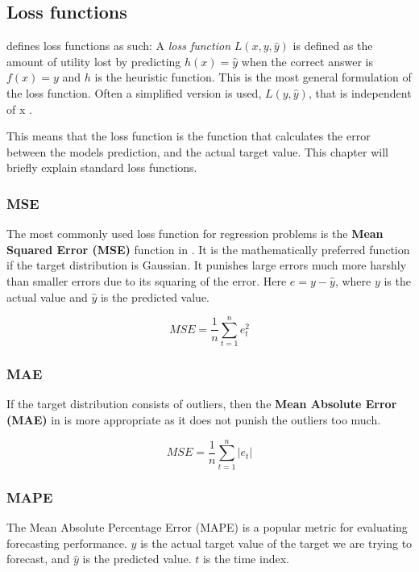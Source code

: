 \subsection{Loss functions}
\label{section:BT:Loss}
\citeauthor{Russel2012}  defines loss functions as such:
A \textit{loss function} $L(x, y, \hat{y})$ is defined as the amount of utility lost by predicting
$h(x)=\hat{y}$ when the correct answer is $f(x) = y$ and $h$ is the heuristic function.
This is the most general formulation of the loss function. Often a simplified version is used,
$L(y, \hat{y})$, that is independent of x \cite[p. 710-711]{Russel2012}.

This means that the loss function is the function that calculates the error between the
models prediction, and the actual target value.
This chapter will briefly explain standard loss functions.


\subsubsection{MSE}
The most commonly used loss function for regression problems is the
\textbf{Mean Squared Error (MSE)} function in .
It is the mathematically preferred function if the target distribution is Gaussian.
It punishes large errors much more harshly than smaller errors due to its squaring of the error.
Here $e = y - \hat{y}$, where $y$ is the actual value and $\hat{y}$ is the predicted value.

\begin{equation}
  \label{eq:mean-squared-error}
  MSE = \frac{1}{n} \sum_{t=1}^n e_t^2
\end{equation}

\subsubsection{MAE}
If the target distribution consists of outliers, then the
\textbf{Mean Absolute Error (MAE)} in  is more appropriate
as it does not punish the outliers too much.

\begin{equation}
  \label{eq:mean-absolute-error}
  MSE = \frac{1}{n} \sum_{t=1}^n |e_t|
\end{equation}

\subsubsection{MAPE}
The Mean Absolute Percentage Error  (MAPE) is a popular metric for evaluating forecasting performance.
$y$ is the actual target value of the target we are trying to forecast, and $\hat{y}$ is the predicted value.
$t$ is the time index.

